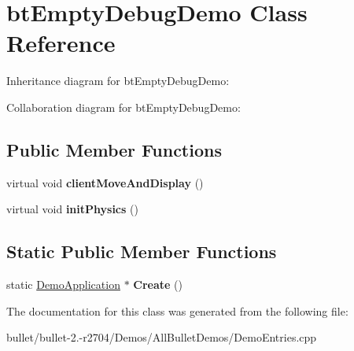 \hypertarget{classbt_empty_debug_demo}{\section{bt\+Empty\+Debug\+Demo Class Reference}
\label{classbt_empty_debug_demo}
}


Inheritance diagram for bt\+Empty\+Debug\+Demo\+:


Collaboration diagram for bt\+Empty\+Debug\+Demo\+:
\subsection*{Public Member Functions}
\begin{DoxyCompactItemize}
\item 
\hypertarget{classbt_empty_debug_demo_afe8da2859aa0c244800c248ff352e888}{virtual void {\bfseries client\+Move\+And\+Display} ()}\label{classbt_empty_debug_demo_afe8da2859aa0c244800c248ff352e888}

\item 
\hypertarget{classbt_empty_debug_demo_a75e65079a6f54406997f20e95f10dd64}{virtual void {\bfseries init\+Physics} ()}\label{classbt_empty_debug_demo_a75e65079a6f54406997f20e95f10dd64}

\end{DoxyCompactItemize}
\subsection*{Static Public Member Functions}
\begin{DoxyCompactItemize}
\item 
\hypertarget{classbt_empty_debug_demo_a784f257b45269ab9c53efc528dbdd14d}{static \hyperlink{class_demo_application}{Demo\+Application} $\ast$ {\bfseries Create} ()}\label{classbt_empty_debug_demo_a784f257b45269ab9c53efc528dbdd14d}

\end{DoxyCompactItemize}


The documentation for this class was generated from the following file\+:\begin{DoxyCompactItemize}
\item 
bullet/bullet-\/2.-\/r2704/\+Demos/\+All\+Bullet\+Demos/Demo\+Entries.\+cpp\end{DoxyCompactItemize}
